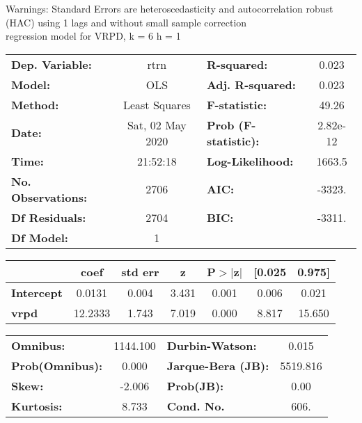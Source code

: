 Warnings: \newline
 [1] Standard Errors are heteroscedasticity and autocorrelation robust (HAC) using 1 lags and without small sample correction\\ 

regression model for VRPD, k = 6 h = 1\begin{center}
\begin{tabular}{lclc}
\toprule
\textbf{Dep. Variable:}    &       rtrn       & \textbf{  R-squared:         } &     0.023   \\
\textbf{Model:}            &       OLS        & \textbf{  Adj. R-squared:    } &     0.023   \\
\textbf{Method:}           &  Least Squares   & \textbf{  F-statistic:       } &     49.26   \\
\textbf{Date:}             & Sat, 02 May 2020 & \textbf{  Prob (F-statistic):} &  2.82e-12   \\
\textbf{Time:}             &     21:52:18     & \textbf{  Log-Likelihood:    } &    1663.5   \\
\textbf{No. Observations:} &        2706      & \textbf{  AIC:               } &    -3323.   \\
\textbf{Df Residuals:}     &        2704      & \textbf{  BIC:               } &    -3311.   \\
\textbf{Df Model:}         &           1      & \textbf{                     } &             \\
\bottomrule
\end{tabular}
\begin{tabular}{lcccccc}
                   & \textbf{coef} & \textbf{std err} & \textbf{z} & \textbf{P$> |$z$|$} & \textbf{[0.025} & \textbf{0.975]}  \\
\midrule
\textbf{Intercept} &       0.0131  &        0.004     &     3.431  &         0.001        &        0.006    &        0.021     \\
\textbf{vrpd}      &      12.2333  &        1.743     &     7.019  &         0.000        &        8.817    &       15.650     \\
\bottomrule
\end{tabular}
\begin{tabular}{lclc}
\textbf{Omnibus:}       & 1144.100 & \textbf{  Durbin-Watson:     } &    0.015  \\
\textbf{Prob(Omnibus):} &   0.000  & \textbf{  Jarque-Bera (JB):  } & 5519.816  \\
\textbf{Skew:}          &  -2.006  & \textbf{  Prob(JB):          } &     0.00  \\
\textbf{Kurtosis:}      &   8.733  & \textbf{  Cond. No.          } &     606.  \\
\bottomrule
\end{tabular}
\end{center}

